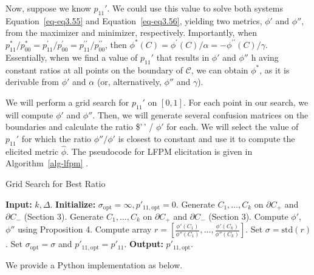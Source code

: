 \documentclass[
  letterpaper,
  numbers=noenddot,
  DIV=11]{scrreprt}
\theoremstyle{plain}
\theoremstyle{definition}
\theoremstyle{remark}
\begin{document}
Now, suppose we know \(p_{11}'\). We could use this value to solve both
systems Equation~\ref{eq-eq3.55} and Equation~\ref{eq-eq3.56}, yielding
two metrics, \(\phi'\) and \(\phi''\), from the maximizer and minimizer,
respectively. Importantly, when
\(p_{11}^{*} / p_{00}^{*}=p_{11}^{\prime} / p_{00}^{\prime}=p_{11}^{\prime \prime} / p_{00}^{\prime \prime}\),
then
\(\phi^{*}(C)=\phi^{\prime}(C) / \alpha=-\phi^{\prime \prime}(C) / \gamma\).
Essentially, when we find a value of \(p_{11}'\) that results in
\(\phi'\) and \(\phi''\) h aving constant ratios at all points on the
boundary of \(\mathcal{C}\), we can obtain \(\phi^*\), as it is
derivable from \(\phi'\) and \(\alpha\) (or, alternatively, \(\phi''\)
and \(\gamma\)).

We will perform a grid search for \(p_{11}'\) on \([0,1]\). For each
point in our search, we will compute \(\phi'\) and \(\phi''\). Then, we
will generate several confusion matrices on the boundaries and calculate
the ratio \$\phi'\,' / \(\phi'\) for each. We will select the value of
\(p_{11}'\) for which the ratio \(\phi'' / \phi'\) is closest to
constant and use it to compute the elicited metric \(\hat{\phi}\). The
pseudocode for LFPM elicitation is given in  Algorithm~\ref{alg-lfpm} .

\begin{algorithm}[H]
    \caption{Grid Search for Best Ratio}
    \label{alg-lfpm}
\begin{algorithmic}[1]
        \State \textbf{Input:} $k, \Delta$.
        \State \textbf{Initialize:} $\sigma_{\text{opt}} = \infty, p'_{11,\text{opt}} = 0$.
        \State Generate $C_1, \dots, C_k$ on $\partial C_+$ and $\partial C_-$ (Section 3).
        \State Generate $C_1, \dots, C_k$ on $\partial C_+$ and $\partial C_-$ (Section 3).
            \State Compute $\phi'$, $\phi''$ using Proposition 4. 
            \State Compute array $r = \left[ \frac{\phi'(C_1)}{\phi''(C_1)}, \dots, \frac{\phi'(C_k)}{\phi''(C_k)} \right]$.
            \State Set $\sigma = \text{std}(r)$.
                \State Set $\sigma_{\text{opt}} = \sigma$ and $p'_{11,\text{opt}} = p'_{11}$.
            \EndIf
        \EndFor
        \State \textbf{Output:} $p'_{11,\text{opt}}$.
    \end{algorithmic}
\end{algorithm}

We provide a Python implementation as below.
\end{document}
